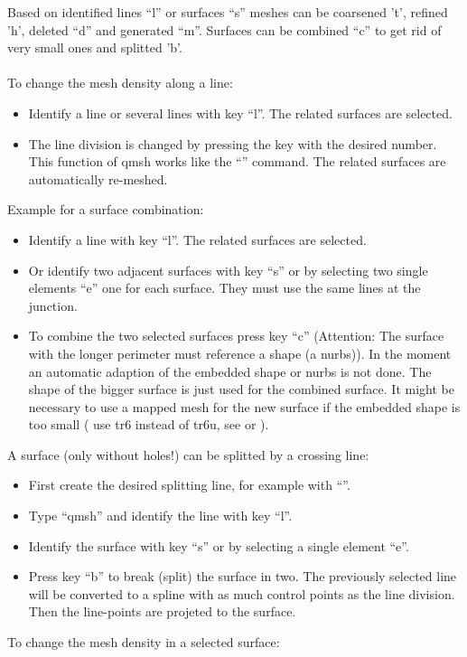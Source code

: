 \documentclass{article}
\begin{document}
Based on identified lines ``l'' or surfaces ``s'' meshes can be coarsened 't', refined 'h', deleted ``d'' and generated ``m''. Surfaces can be combined ``c'' to get rid of very small ones and splitted 'b'.\\\\
To change the mesh density along a line:
\begin{itemize}
\item Identify a line or several lines with key ``l''. The related surfaces are selected.
\item The line division is changed by pressing the key with the desired number. This function of qmsh works like the ``'' command. The related surfaces are automatically re-meshed.
\end{itemize}
Example for a surface combination:
\begin{itemize}
\item Identify a line with key ``l''. The related surfaces are selected.
\item Or identify two adjacent surfaces with key ``s'' or by selecting two single elements ``e'' one for each surface. They must use the same lines at the junction. 
\item To combine the two selected surfaces press key ``c'' (Attention: The surface with the longer perimeter must reference a shape (a nurbs)). In the moment an automatic adaption of the embedded shape or nurbs is not done. The shape of the bigger surface is just used for the combined surface. It might be necessary to use a mapped mesh for the new surface if the embedded shape is too small ( use tr6 instead of tr6u, see  or ).
\end{itemize}
A surface (only without holes!) can be splitted by a crossing line:
\begin{itemize}
\item First create the desired splitting line, for example with ``''.
\item Type ``qmsh'' and identify the line with key ``l''.
\item Identify the surface with key ``s'' or by selecting a single element ``e''.
\item Press key ``b'' to break (split) the surface in two. The previously selected line will be converted to a spline with as much control points as the line division. Then the line-points are projeted to the surface.
\end{itemize}
To change the mesh density in a selected surface:
\end{document}
